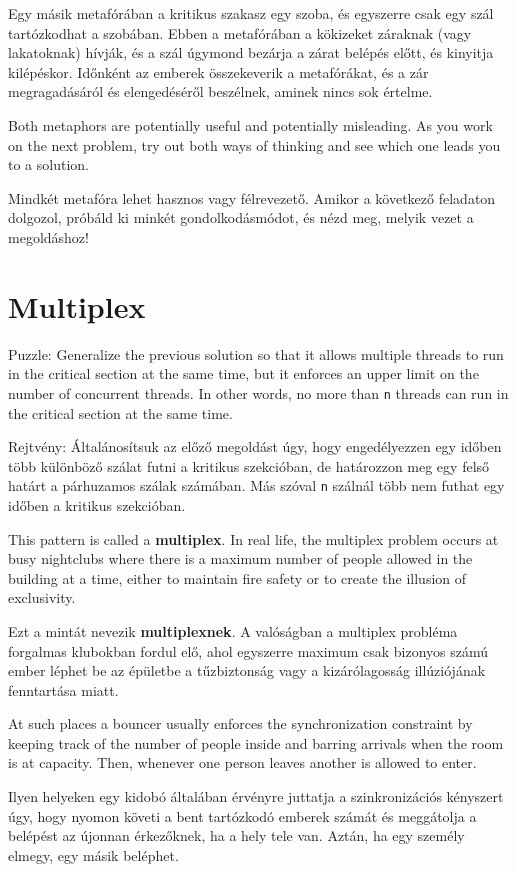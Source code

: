 \documentclass{book}
\begin{document}
Egy másik metafórában a kritikus szakasz egy szoba, és egyszerre
csak egy szál tartózkodhat a szobában. Ebben a metafórában
a kökizeket záraknak (vagy lakatoknak) hívják, és a szál úgymond
bezárja a zárat belépés előtt, és kinyitja kilépéskor.
Időnként az emberek összekeverik a metafórákat, és
a zár megragadásáról és elengedéséről beszélnek, aminek
nincs sok értelme.

Both metaphors are potentially useful and potentially misleading.
As you work on the next problem, try out both ways of thinking
and see which one leads you to a solution.

Mindkét metafóra lehet hasznos vagy félrevezető. Amikor a következő
feladaton dolgozol, próbáld ki minkét gondolkodásmódot, és nézd
meg, melyik vezet a megoldáshoz!

\section{Multiplex}

Puzzle: Generalize the previous solution so that it allows multiple
threads to run in the critical section at the same time, but it
enforces an upper limit on the number of concurrent threads.  In other
words, no more than {\tt n} threads can run in the critical section at
the same time.

Rejtvény: Általánosítsuk az előző megoldást úgy, hogy engedélyezzen egy
időben több különböző szálat futni a kritikus szekcióban, de határozzon
meg egy felső határt a párhuzamos szálak számában. Más szóval {\tt n} szálnál
több nem futhat egy időben a kritikus szekcióban.

This pattern is called a {\bf multiplex}.  In real life, the multiplex
problem occurs at busy nightclubs where there is a maximum number of
people allowed in the building at a time, either to maintain fire
safety or to create the illusion of exclusivity.

Ezt a mintát nevezik {\bf multiplexnek}. A valóságban a multiplex probléma
forgalmas klubokban fordul elő, ahol egyszerre maximum csak bizonyos számú
ember léphet be az épületbe a tűzbiztonság vagy a kizárólagosság
illúziójának fenntartása miatt.

At such places a bouncer usually enforces the synchronization
constraint by keeping track of the number of people inside
and barring arrivals when the room is at capacity.  Then,
whenever one person leaves another is allowed to enter.

Ilyen helyeken egy kidobó általában érvényre juttatja a szinkronizációs kényszert
úgy, hogy nyomon követi a bent tartózkodó emberek számát és meggátolja a belépést
az újonnan érkezőknek, ha a hely tele van. Aztán, ha egy személy elmegy,
egy másik beléphet.
\end{document}
